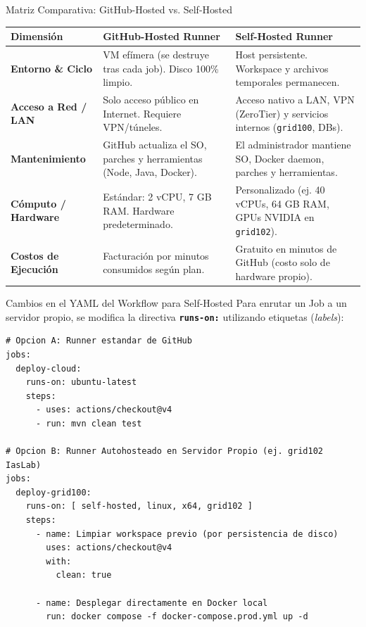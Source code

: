 \documentclass[aspectratio=169]{beamer}
\begin{document}
\begin{frame}{Matriz Comparativa: GitHub-Hosted vs. Self-Hosted}
  \vspace{-0.1cm}
  \fontsize{7.5}{9.5}\selectfont
  \renewcommand{\arraystretch}{1.12}
  \begin{tabularx}{\textwidth}{|p{2.8cm}|X|X|}
    \hline
    \rowcolor{cbLight}
    \textbf{Dimensión} & \textbf{GitHub-Hosted Runner} & \textbf{Self-Hosted Runner} \\ \hline
    \textbf{Entorno \& Ciclo} & VM efímera (se destruye tras cada job). Disco 100\% limpio. & Host persistente. Workspace y archivos temporales permanecen. \\ \hline
    \textbf{Acceso a Red / LAN} & Solo acceso público en Internet. Requiere VPN/túneles. & Acceso nativo a LAN, VPN (ZeroTier) y servicios internos (\texttt{grid100}, DBs). \\ \hline
    \textbf{Mantenimiento} & GitHub actualiza el SO, parches y herramientas (Node, Java, Docker). & El administrador mantiene SO, Docker daemon, parches y herramientas. \\ \hline
    \textbf{Cómputo / Hardware} & Estándar: 2 vCPU, 7 GB RAM. Hardware predeterminado. & Personalizado (ej. 40 vCPUs, 64 GB RAM, GPUs NVIDIA en \texttt{grid102}). \\ \hline
    \textbf{Costos de Ejecución} & Facturación por minutos consumidos según plan. & Gratuito en minutos de GitHub (costo solo de hardware propio). \\ \hline
  \end{tabularx}
\end{frame}

\begin{frame}[fragile]{Cambios en el YAML del Workflow para Self-Hosted}
  \vspace{-0.1cm}
  Para enrutar un Job a un servidor propio, se modifica la directiva \textbf{\texttt{runs-on:}} utilizando etiquetas (\textit{labels}):
  \vspace{0.05cm}
  \begin{lstlisting}[style=yamltiny]
# Opcion A: Runner estandar de GitHub
jobs:
  deploy-cloud:
    runs-on: ubuntu-latest
    steps:
      - uses: actions/checkout@v4
      - run: mvn clean test

# Opcion B: Runner Autohosteado en Servidor Propio (ej. grid102 IasLab)
jobs:
  deploy-grid100:
    runs-on: [ self-hosted, linux, x64, grid102 ]
    steps:
      - name: Limpiar workspace previo (por persistencia de disco)
        uses: actions/checkout@v4
        with:
          clean: true

      - name: Desplegar directamente en Docker local
        run: docker compose -f docker-compose.prod.yml up -d
  \end{lstlisting}
\end{frame}
\end{document}
